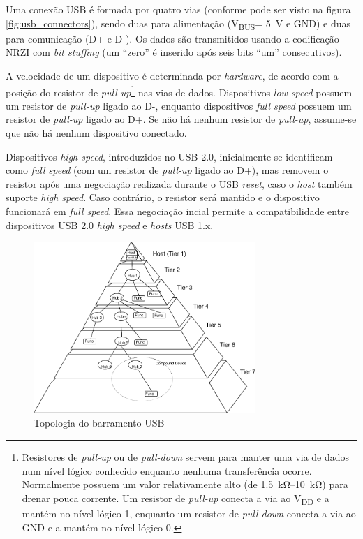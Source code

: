 \documentclass[brazil,pagestart=firstchapter]{abnt}
\newcommand*{\VBUS}{V\textsubscript{BUS}\xspace}
\newcommand*{\VDD}{V\textsubscript{DD}\xspace}
\newcommand*{\GND}{GND\xspace}
\begin{document}
Uma conexão \ac{USB} é formada por quatro vias (conforme pode ser visto na
figura \ref{fig:usb_connectors}), sendo duas para alimentação (\VBUS =
\SI{+5}{\volt} e \GND) e duas para comunicação (D+ e D-). Os dados são
transmitidos usando a codificação \ac{NRZI} com \textit{bit stuffing} (um
``zero'' é inserido após seis bits ``um'' consecutivos).
\cite[p.~157]{usb20} \cite[cap.~2]{usbinanutshell}

A velocidade de um dispositivo é determinada por \textit{hardware}, de
acordo com a posição do resistor de \textit{pull-up}\footnote{
	Resistores de \textit{pull-up} ou de \textit{pull-down} servem para
	manter uma via de dados num nível lógico conhecido enquanto nenhuma
	transferência ocorre.  Normalmente possuem um valor relativamente alto
	(de \SIrange{1.5}{10}{\kilo\ohm}) para drenar pouca corrente. Um
	resistor de \textit{pull-up} conecta a via ao \VDD e a mantém no nível
	lógico 1, enquanto um resistor de \textit{pull-down} conecta a via ao
	\GND e a mantém no nível lógico 0.}
nas vias de dados. Dispositivos
\textit{low speed} possuem um resistor de \textit{pull-up} ligado ao D-,
enquanto dispositivos \textit{full speed} possuem  um resistor de
\textit{pull-up} ligado ao D+. Se não há nenhum resistor de
\textit{pull-up}, assume-se que não há nenhum dispositivo conectado.
\cite[p.~141]{usb20} \cite[cap.~2]{usbinanutshell}

Dispositivos \textit{high speed}, introduzidos no \ac{USB} 2.0, inicialmente
se identificam como \textit{full speed} (com um resistor de \textit{pull-up}
ligado ao D+), mas removem o resistor após uma negociação realizada durante
o USB \textit{reset}, caso o \textit{host} também suporte \textit{high
speed}. Caso contrário, o resistor será mantido e o dispositivo funcionará
em \textit{full speed}. Essa negociação incial permite a compatibilidade
entre dispositivos USB 2.0 \textit{high speed} e \textit{hosts} USB 1.x.
\cite[p.~142]{usb20} \cite[cap.~2]{usbinanutshell}

\begin{figure}[h]
\centering
\includegraphics[width=0.75\textwidth]{img/usb_bus_topology.pdf}
\caption{Topologia do barramento USB}
\label{fig:usb_topology}
\end{figure}
\end{document}
